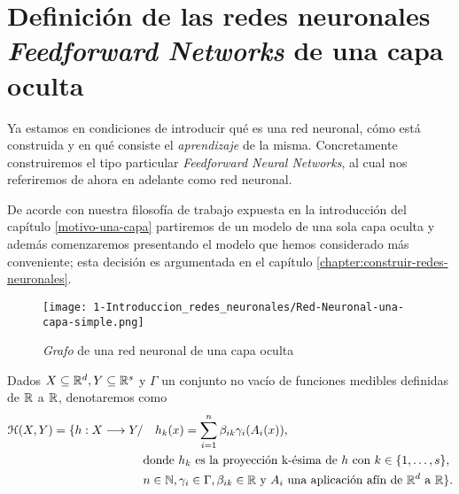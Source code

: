 \section{Definición de las redes neuronales \textit{Feedforward Networks} 
de una capa oculta} \label{sec:redes-neuronales-intro-una-capa}

Ya estamos en condiciones de introducir qué es una red neuronal,
cómo está construida y en qué consiste el \textit{aprendizaje} de la misma. 
Concretamente
construiremos el tipo particular \textit{Feedforward Neural Networks}, al cual nos referiremos de ahora
en adelante como red neuronal.

De acorde con nuestra filosofía de trabajo expuesta en la introducción del capítulo \ref{motivo-una-capa}
partiremos de un modelo de una sola capa oculta y además comenzaremos presentando el modelo que 
hemos considerado más conveniente; esta decisión es argumentada en el capítulo \ref{chapter:construir-redes-neuronales}. 

\begin{figure}[H]
    \centering
    \texttt{[image: 1-Introduccion\_redes\_neuronales/Red-Neuronal-una-capa-simple.png]}
    \caption{\textit{Grafo} de una red neuronal de una capa oculta}
    \label{img:grafo-red-neuronal-una-capa-oculta}
\end{figure}

    \begin{aportacionOriginal}
    \begin{definicion} \label{definition:redes_neuronales_una_capa_oculta}
        Dados $X \subseteq \mathbb{R}^d, Y \subseteq \mathbb{R}^s$ y  $\Gamma$ un conjunto no vacío de funciones medibles definidas de $\mathbb{R}$ a $\mathbb{R}$, denotaremos como 
        \begin{align}
            \mathcal{H}(X,Y) 
            =
            \{
                h : X \longrightarrow Y 
                /& \quad 
                h_k(x) = 
                \sum_{i=1}^{n} \beta_{i k} \gamma_{i}( A_{i}(x)), \\
                & \text{donde  $h_k$  es la proyección k-ésima de $h$ con 
                $k \in \{1, \ldots, s\}$}, \\
                & n \in \mathbb{N},\gamma_{i} \in \Gamma , \beta_{i k} \in \mathbb{R}
                \text{ y }A_{i} \text{ una aplicación afín de $\mathbb{R}^d$ a $\mathbb{R}$}           
            \}.
        \end{align}
    \end{definicion}
\end{aportacionOriginal}

